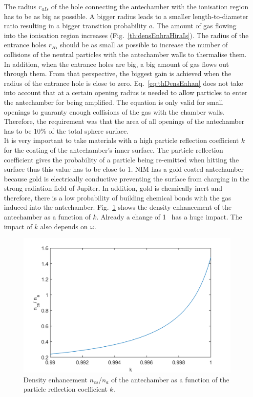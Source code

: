 	The radius $r_{aIs}$ of the hole connecting the antechamber with the ionisation region has to be as big as possible. A bigger radius leads to a smaller length-to-diameter ratio resulting in a bigger transition probability $a$. The amount of gas flowing into the ionisation region increases (Fig.~\ref{th:densEnhraHiraIs}). The radius of the entrance holes $r_{Hi}$ should be as small as possible to increase the number of collisions of the neutral particles with the antechamber walls to thermalise them. In addition, when the entrance holes are big, a big amount of gas flows out through them. From that perspective, the biggest gain is achieved when the radius of the entrance hole is close to zero. Eq.~\eqref{eq:thDensEnhan} does not take into account that at a certain opening radius is needed to allow particles to enter the antechamber for being amplified. The equation is only valid for small openings to guaranty enough collisions of the gas with the chamber walls. Therefore, the requirement was that the area of all openings of the antechamber has to be 10\% of the total sphere surface.\\
	It is very important to take materials with a high particle reflection coefficient $k$ for the coating of the antechamber's inner surface. The particle reflection coefficient gives the probability of a particle being re-emitted when hitting the surface thus this value has to be close to 1. NIM has a gold coated antechamber because gold is electrically conductive preventing the surface from charging in the strong radiation field of Jupiter. In addition, gold is chemically inert and therefore, there is a low probability of building chemical bonds with the gas induced into the antechamber. Fig.~\ref{th:densEnhk} shows the density enhancement of the antechamber as a function of $k$. Already a change of 1\textperthousand~ has a huge impact. The impact of $k$ also depends on $\omega$.
	\begin{figure}[h!] %
		\centering
		\includegraphics[width= .7\textwidth]{Bilder/k.png}
		\caption{Density enhancement $n_{cs}/n_a$ of the antechamber as a function of the particle reflection coefficient $k$.}
		\label{th:densEnhk}
	\end{figure}
